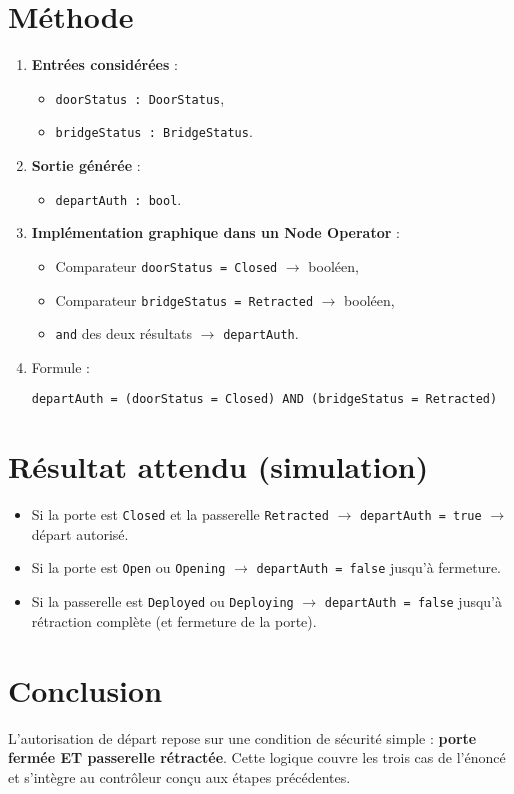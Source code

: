 \documentclass[11pt,a4paper]{report}
\begin{document}
\section*{Méthode}
\begin{enumerate}
  \item \textbf{Entrées considérées} :
  \begin{itemize}
    \item \texttt{doorStatus : DoorStatus},
    \item \texttt{bridgeStatus : BridgeStatus}.
  \end{itemize}

  \item \textbf{Sortie générée} :
  \begin{itemize}
    \item \texttt{departAuth : bool}.
  \end{itemize}

  \item \textbf{Implémentation graphique dans un Node Operator} :
  \begin{itemize}
    \item Comparateur \texttt{doorStatus = Closed} $\rightarrow$ booléen,
    \item Comparateur \texttt{bridgeStatus = Retracted} $\rightarrow$ booléen,
    \item \texttt{and} des deux résultats $\rightarrow$ \texttt{departAuth}.
  \end{itemize}

  \item Formule :
\begin{lstlisting}
departAuth = (doorStatus = Closed) AND (bridgeStatus = Retracted)
\end{lstlisting}
\end{enumerate}

\section*{Résultat attendu (simulation)}
\begin{itemize}
  \item Si la porte est \texttt{Closed} et la passerelle \texttt{Retracted} $\rightarrow$ \texttt{departAuth = true} $\rightarrow$ départ autorisé.
  \item Si la porte est \texttt{Open} ou \texttt{Opening} $\rightarrow$ \texttt{departAuth = false} jusqu’à fermeture.
  \item Si la passerelle est \texttt{Deployed} ou \texttt{Deploying} $\rightarrow$ \texttt{departAuth = false} jusqu’à rétraction complète (et fermeture de la porte).
\end{itemize}

\section*{Conclusion}
L’autorisation de départ repose sur une condition de sécurité simple : \textbf{porte fermée ET passerelle rétractée}.  
Cette logique couvre les trois cas de l’énoncé et s’intègre au contrôleur conçu aux étapes précédentes.


\end{document}
